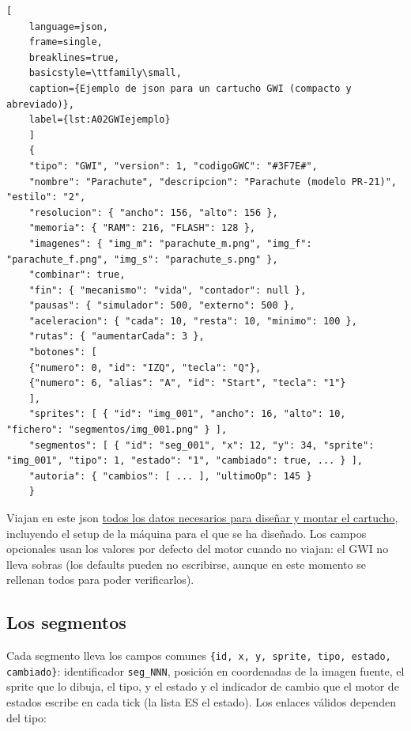 \begin{lstlisting}[
	language=json, 
	frame=single, 
	breaklines=true, 
	basicstyle=\ttfamily\small,
	caption={Ejemplo de json para un cartucho GWI (compacto y abreviado)},
	label={lst:A02GWIejemplo}
	]
	{
	"tipo": "GWI", "version": 1, "codigoGWC": "#3F7E#",
	"nombre": "Parachute", "descripcion": "Parachute (modelo PR-21)", "estilo": "2",
	"resolucion": { "ancho": 156, "alto": 156 },
	"memoria": { "RAM": 216, "FLASH": 128 },
	"imagenes": { "img_m": "parachute_m.png", "img_f": "parachute_f.png", "img_s": "parachute_s.png" },
	"combinar": true,
	"fin": { "mecanismo": "vida", "contador": null },
	"pausas": { "simulador": 500, "externo": 500 },
	"aceleracion": { "cada": 10, "resta": 10, "minimo": 100 },
	"rutas": { "aumentarCada": 3 },
	"botones": [
	{"numero": 0, "id": "IZQ", "tecla": "Q"},
	{"numero": 6, "alias": "A", "id": "Start", "tecla": "1"}
	],
	"sprites": [ { "id": "img_001", "ancho": 16, "alto": 10, "fichero": "segmentos/img_001.png" } ],
	"segmentos": [ { "id": "seg_001", "x": 12, "y": 34, "sprite": "img_001", "tipo": 1, "estado": "1", "cambiado": true, ... } ],
	"autoria": { "cambios": [ ... ], "ultimoOp": 145 }
	}
\end{lstlisting}

Viajan en este json \underline{todos los datos necesarios para diseñar y montar el
cartucho}, incluyendo el setup de la máquina para el que se ha diseñado. Los campos opcionales usan los valores
por defecto del motor cuando no viajan: el GWI no lleva sobras (los defaults pueden 
no escribirse, aunque en este momento se rellenan todos para poder verificarlos).

\subsection{Los segmentos}
\label{sec:A02Segmentos}

Cada segmento lleva los campos comunes \texttt{\{id, x, y, sprite, tipo,
	estado, cambiado\}}: identificador \texttt{seg\_NNN}, posición en
coordenadas de la imagen fuente, el sprite que lo dibuja, el tipo, y el
estado y el indicador de cambio que el motor de estados escribe en cada
tick (la lista ES el estado). Los enlaces válidos dependen del tipo:

